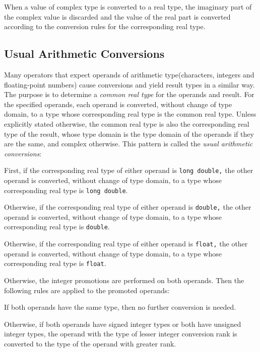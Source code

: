 When a value of complex type is converted to a real type, the imaginary part of
the complex value is discarded and the value of the real part is converted
according to the conversion rules for the corresponding real type.

\subsection{Usual Arithmetic Conversions}
Many operators that expect operands of arithmetic type(characters, integers and
floating-point numbers) cause conversions and
yield result types in a similar way. The purpose is to determine a
\textit{common real type} for the operands and result. For the specified
operands, each operand is converted, without change of type domain, to a type
whose corresponding real type is the common real type. Unless explicitly stated
otherwise, the common real type is also the corresponding real type of the
result, whose type domain is the type domain of the operands if they are the
same, and complex otherwise. This pattern is called the \textit{usual
  arithmetic conversions}:

\setlength{\leftskip}{1.5cm}

\noindent First, if the corresponding real type of either operand is \texttt{long
  double,} the other operand is converted, without change of type domain, to a
type whose corresponding real type is \texttt{long double}.


\noindent Otherwise, if the corresponding real type of either operand is \texttt{double,}
the other operand is converted, without change of type domain, to a type whose
corresponding real type is \texttt{double}.


\noindent Otherwise, if the corresponding real type of either operand is \texttt{float,}
the other operand is converted, without change of type domain, to a type whose
corresponding real type is \texttt{float}.


\noindent Otherwise, the integer promotions are performed on both operands. Then the
following rules are applied to the promoted operands:

\setlength{\leftskip}{3cm}

\noindent If both operands have the same type, then no further conversion is needed.


\noindent Otherwise, if both operands have signed integer types or both have unsigned
integer types, the operand with the type of lesser integer conversion rank is
converted to the type of the operand with greater rank.


